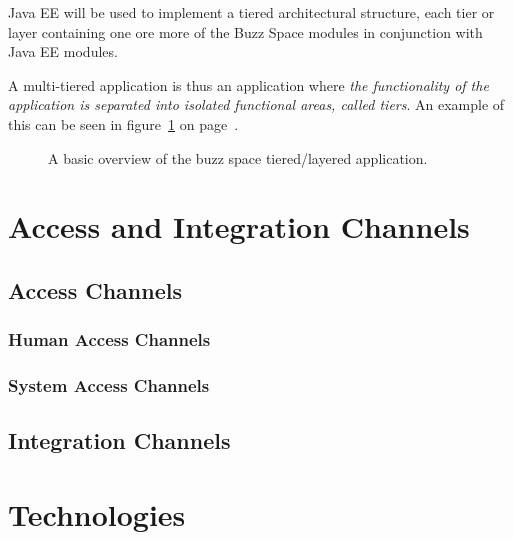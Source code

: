 \documentclass[a4paper,12pt,titlepage]{article}
\begin{document}
Java EE will be used to implement a tiered architectural structure, each tier or layer containing one ore more of the Buzz Space modules in conjunction with Java EE modules. 

A multi-tiered application is thus an application where \textit{the functionality of the application is separated into isolated functional areas, called tiers}. An example of this can be seen in figure~\ref{fig:refarchandmvc} on page~\pageref{fig:refarchandmvc}.
\begin{figure}[H]
	\centering
	\caption{A basic overview of the buzz space tiered/layered application.}
	\label{fig:refarchandmvc}
\end{figure}
\newpage
\section{Access and Integration Channels}
\subsection{Access Channels}
\subsubsection{Human Access Channels}%
\subsubsection{System Access Channels}%
	
\subsection{Integration Channels}%
	
\newpage
\section{Technologies}%
\end{document}
